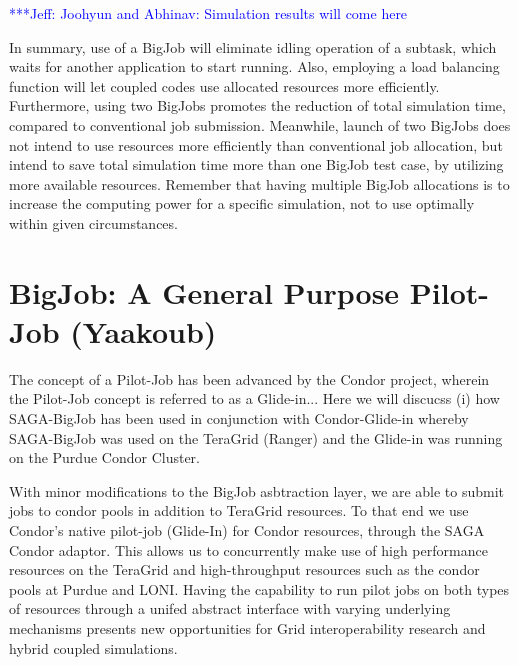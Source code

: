 \documentclass[conference,final]{IEEEtran}
\newcommand{\skonote}[1]{ {\textcolor{blue} { ***Jeff: #1 }}}
\newcommand{\skonote}[1]{}
\begin{document}
\skonote{Joohyun and Abhinav: Simulation results will come here}

In summary, use of a BigJob will eliminate idling operation of a subtask, which waits for another application to start running. Also, employing a load balancing function will let coupled codes use allocated resources more efficiently. Furthermore, using two BigJobs promotes the reduction of total simulation time, compared to conventional job submission. Meanwhile, launch of two BigJobs does not intend to use resources more efficiently than conventional job allocation, but intend to save total simulation time more than one BigJob test case, by utilizing more available resources. Remember that having multiple BigJob allocations is to increase the computing power for a specific simulation, not to use optimally within given circumstances.


\section{BigJob: A General Purpose Pilot-Job (Yaakoub)}

The concept of a Pilot-Job has been advanced by the Condor project, wherein the Pilot-Job concept is referred to as a Glide-in...  Here we will discucss (i) how SAGA-BigJob has been used in conjunction with Condor-Glide-in whereby SAGA-BigJob was used on the TeraGrid (Ranger) and the Glide-in was running on the Purdue Condor Cluster.

With minor modifications to the BigJob asbtraction layer, we are able to submit jobs to condor pools in addition to TeraGrid resources. To that end we use Condor's native pilot-job (Glide-In) for Condor resources, through the SAGA Condor adaptor. This allows us to concurrently make use of high performance resources on the TeraGrid and high-throughput resources such as the condor pools at Purdue and LONI. Having the capability to run pilot jobs on both types of resources through a unifed abstract interface with varying underlying mechanisms presents new opportunities for Grid interoperability research and hybrid coupled simulations.

\end{document}
